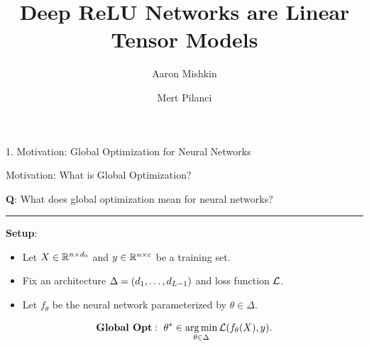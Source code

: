 \documentclass[usenames,dvipsnames,notheorems]{beamer}
\title{Deep ReLU Networks are Linear Tensor Models}
\author{Aaron Mishkin \and Mert Pilanci}
\date{}
\newcommand{\horizontalrule}{
	{
			\vspace{-0.5em}
			\center \rule{\textwidth}{0.1em}
			\vspace{-0.2em}
		}
}
\newcommand{\good}[1]{\textcolor{good}{#1}}
\begin{document}
\maketitle


\begin{frame}{}
	\begin{center}
		\huge 1. Motivation: Global Optimization for Neural Networks
	\end{center}
\end{frame}

\begin{frame}{Motivation: What is Global Optimization?}

	\begin{center}
		\large
		\textbf{Q}: What does global optimization mean for neural networks?
	\end{center}

	\pause
	\horizontalrule

	\textbf{Setup}:

	\vspace{0.5ex}
	\pause

	\begin{itemize}
		\item Let \( X \in \mathbb{R}^{n \times d_0} \) and \( y \in \mathbb{R}^{n \times c} \)
		      be a \good{training set}.
		      \pause
		      \vspace{1ex}

		\item Fix an \good{architecture} \( \Delta = \left(d_1, \ldots, d_{L-1}\right) \)
		      and \good{loss function} \( \mathcal{L} \).
		      \pause
		      \vspace{1ex}

		\item Let \( f_\theta \) be the \good{neural network} parameterized by
		      \( \theta \in \Delta \).
	\end{itemize}

	\pause
	\vspace{-0.5ex}

	\[
		\textbf{Global Opt}: \, \, \theta^* \in
		\mathop{\rm arg\,min}_{\theta \in \Delta} \mathcal{L}(f_\theta(X), y).
	\]
	\pause

	\vspace{-3.5ex}

	\begin{center}
		
	\end{center}

\end{frame}
\end{document}
